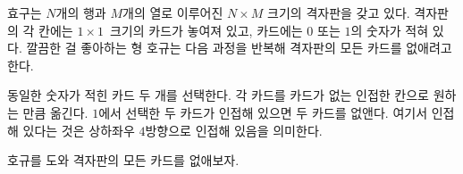 효구는 $N$개의 행과 $M$개의 열로 이루어진 $N \times M$ 크기의 격자판을 갖고 있다. 격자판의 각 칸에는 $1\times1$ 크기의 카드가 놓여져 있고, 카드에는 $0$ 또는 $1$의 숫자가 적혀 있다. 깔끔한 걸 좋아하는 형 호규는 다음 과정을 반복해 격자판의 모든 카드를 없애려고 한다.

동일한 숫자가 적힌 카드 두 개를 선택한다.
각 카드를 카드가 없는 인접한 칸으로 원하는 만큼 옮긴다.
$1$에서 선택한 두 카드가 인접해 있으면 두 카드를 없앤다.
여기서 인접해 있다는 것은 상하좌우 $4$방향으로 인접해 있음을 의미한다.

호규를 도와 격자판의 모든 카드를 없애보자.
